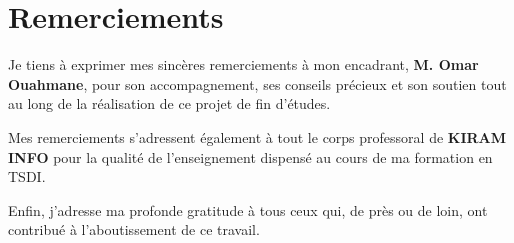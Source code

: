 \chapter*{Remerciements}

\vspace{0.5cm}

Je tiens à exprimer mes sincères remerciements à mon encadrant, \textbf{M. Omar Ouahmane}, pour son accompagnement, ses conseils précieux et son soutien tout au long de la réalisation de ce projet de fin d'études.

\vspace{0.5cm}

Mes remerciements s'adressent également à tout le corps professoral de \textbf{KIRAM INFO} pour la qualité de l'enseignement dispensé au cours de ma formation en TSDI.

\vspace{0.5cm}

Enfin, j'adresse ma profonde gratitude à tous ceux qui, de près ou de loin, ont contribué à l'aboutissement de ce travail.

\ornament
